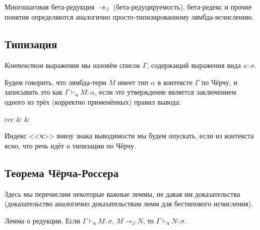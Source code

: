 \documentclass[10pt,a4paper,oneside]{article}
\begin{document}
Многошаговая бета-редукция $\twoheadrightarrow_\beta$ (бета-редуцируемость),
бета-редекс и прочие понятия определяются аналогично просто-типизированному
лямбда-исчислению.

\subsection{Типизация}

\begin{definition}
\emph{Контекстом} выражения мы назовём список $\Gamma$, содержащий выражения вида $x : \sigma$.
\end{definition}

\begin{definition}
Будем говорить, что лямбда-терм $M$ имеет тип $\alpha$ в контексте $\Gamma$ по Чёрчу,
и записывать это как $\Gamma \vdash_\texttt{ч} M: \alpha$, если это утверждение
является заключением одного из трёх (корректно применённых) правил вывода:

\begin{center}
\begin{tabular}{ccc}
 &
 &
\end{tabular}
\end{center}

Индекс <<ч>> внизу знака выводимости мы будем опускать, если из контекста ясно,
что речь идёт о типизации по Чёрчу.

\end{definition}

\subsection{Теорема Чёрча-Россера}

Здесь мы перечислим некоторые важные леммы, не давая им доказательства
(доказательство аналогично доказательствам лемм для бестипового исчисления).

\begin{lemma}Лемма о редукции. Если $\Gamma\vdash_\texttt{ч}M:\sigma$, $M\rightarrow_\beta N$,
то $\Gamma\vdash_\texttt{ч}N:\sigma$.
\end{lemma}
\end{document}
